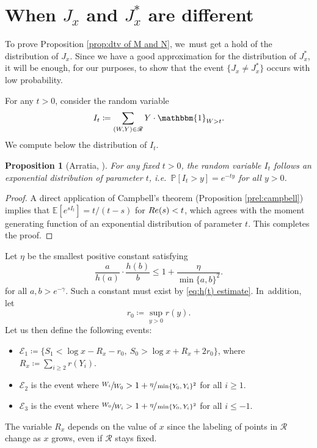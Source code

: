 \documentclass[10pt,a4paper]{amsart}
\providecommand{\ie}{i.e.\ }
\newcommand{\PP}{\mathbb{P}}
\newcommand{\EE}{\mathbb{E}}
\newcommand{\one}{\mathbbm{1}}
\newcommand{\EC}{\mathcal{E}}
\newcommand{\RS}{\mathscr{R}}
\newcommand{\prob}[1]{\PP[ #1 ]}
\renewcommand{\Re}{\textup{Re}}
\newcommand{\bg}{\big}
\theoremstyle{plain}
\newtheorem{prop}[cor]{Proposition}
\theoremstyle{definition}
\providecommand{\ie}{i.e. }
\begin{document}
\section{When \texorpdfstring{$J_x$ and $J_x^*$}{Jxx} are different}
\label{sec:different J and J*}

To prove Proposition \ref{prop:dtv of M and N}, we~must get a hold of the distribution of $J_x$. Since we have a good approximation for the distribution of $J_x^*$, it will be enough, for our purposes, to show that the event $\{J_x\neq J_x^*\}$ occurs with low probability.

For any $t > 0$, consider the random variable
\[
I_t \coloneqq \sum_{(W,Y)\in \RS} Y\cdot \one_{W>t}.
\]
We compute below the distribution of $I_t$.

\begin{prop}[Arratia, \cite{Arratia02}]
\label{prop:icexponential}
For any fixed $t > 0$, the random variable $I_t$ follows an exponential distribution of parameter $t$, \ie $\prob{I_t > y} = e^{-ty}$ for all $y > 0$.
\end{prop}

\begin{proof}
A direct application of Campbell's theorem (Proposition \ref{prel:campbell}) implies that $\EE[e^{sI_t}]=t/(t-s)$ for $\Re(s)<t$, which agrees with the moment generating function of an exponential distribution of parameter $t$. This completes the proof.
\end{proof}

Let $\eta$ be the smallest positive constant satisfying
\[
\frac{a}{h(a)}\cdot \frac{h(b)}{b} \le 1 + \frac{\eta}{\min\{a,b\}^2}.
\]
for all $a, b > e^{-\gamma}$. Such a constant must exist by \eqref{eq:h(t) estimate}. In~addition, let
\[
r_0\coloneqq \sup_{y > 0} r(y).
\]
Let us then define the following events:

\begin{itemize}
\item $\EC_1\coloneqq \bg\{ S_1<\log x-R_x-r_0,\ S_0>\log x+R_x+2r_0\bg\}$, where $R_x\coloneqq \sum_{i\ge2} r(Y_i)$.

\item $\EC_2$ is the event where $\sfrac{W_i}{W_0} > 1 + \sfrac{\eta}{\min\{Y_0,Y_i\}^2}$ for all $i \ge 1$.

\item $\EC_3$ is the event where $\sfrac{W_0}{W_i} > 1 + \sfrac{\eta}{\min\{Y_0,Y_i\}^2}$ for all $i \le -1$.
\end{itemize}
The variable $R_x$ depends on the value of $x$ since the labeling of points in $\mathscr R$ change as $x$ grows, even if $\mathscr R$ stays fixed.
\end{document}
